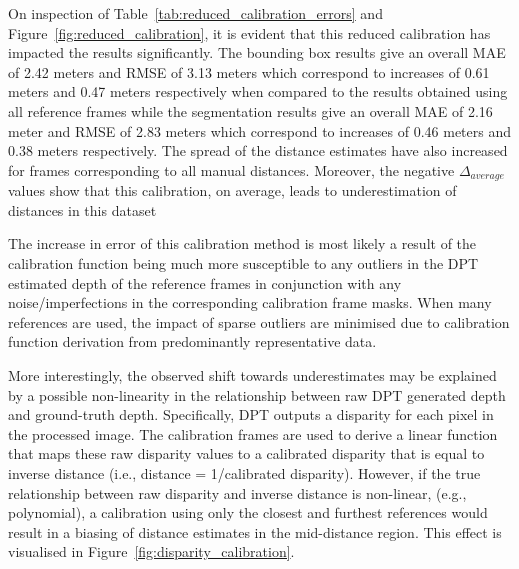 On inspection of Table~\ref{tab:reduced_calibration_errors} and Figure~\ref{fig:reduced_calibration},
it is evident that this reduced calibration has impacted the results significantly.
The bounding box results give an overall MAE of 2.42 meters and RMSE of 3.13 meters which correspond
to increases of 0.61 meters and 0.47 meters respectively when compared to the results obtained using
all reference frames while the segmentation results give an overall MAE of 2.16 meter and RMSE of
2.83 meters which correspond to increases of 0.46 meters and 0.38 meters respectively.
The spread of the distance estimates have also increased for frames corresponding to all manual
distances.
Moreover, the negative $\Delta_{average}$ values show that this calibration, on average, leads to
underestimation of distances in this dataset

The increase in error of this calibration method is most likely a result of the calibration function
being much more susceptible to any outliers in the DPT estimated depth of the reference frames in
conjunction with any noise/imperfections in the corresponding calibration frame masks.
When many references are used, the impact of sparse outliers are minimised due to calibration
function derivation from predominantly representative data.

More interestingly, the observed shift towards underestimates may be explained by a possible
non-linearity in the relationship between raw DPT generated depth and ground-truth depth.
Specifically, DPT outputs a disparity for each pixel in the processed image.
The calibration frames are used to derive a linear function that maps these raw disparity
values to a calibrated disparity\cite{HAUCKE2022101536} that is equal to inverse distance
(i.e., distance = 1/calibrated disparity).
However, if the true relationship between raw disparity and inverse distance is non-linear,
(e.g., polynomial), a calibration using only the closest and furthest references would result
in a biasing of distance estimates in the mid-distance region.
This effect is visualised in Figure~\ref{fig:disparity_calibration}.

